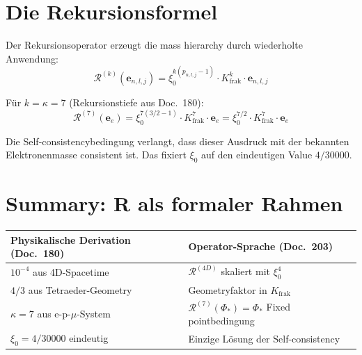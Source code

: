\section{Die Rekursionsformel}

Der Rekursionsoperator erzeugt die mass hierarchy durch wiederholte
Anwendung:
\begin{equation}
  \mathcal{R}^{(k)}(\mathbf{e}_{n,l,j})
  = \xi_0^{k(p_{n,l,j}-1)} \cdot K_{\text{frak}}^k
  \cdot \mathbf{e}_{n,l,j}
  \label{eq:rekursion-k}
\end{equation}

Für $k = \kappa = 7$ (Rekursionstiefe aus Doc.~180):
\begin{equation}
  \mathcal{R}^{(7)}(\mathbf{e}_e) = \xi_0^{7(3/2-1)} \cdot K_{\text{frak}}^7
  \cdot \mathbf{e}_e
  = \xi_0^{7/2} \cdot K_{\text{frak}}^7 \cdot \mathbf{e}_e
\end{equation}

Die Self-consistencybedingung verlangt, dass dieser Ausdruck mit der
bekannten Elektronenmasse consistent ist. Das fixiert $\xi_0$
auf den eindeutigen Value $4/30000$.

\section{Summary: R als formaler Rahmen}

\begin{center}
{\footnotesize
\begin{tabular}{p{4.5cm}p{6cm}}
\toprule
\textbf{Physikalische Derivation} (Doc.~180) &
\textbf{Operator-Sprache} (Doc.~203) \\
\midrule
$10^{-4}$ aus 4D-Spacetime &
  $\mathcal{R}^{(4D)}$ skaliert mit $\xi_0^4$ \\[4pt]
$4/3$ aus Tetraeder-Geometry &
  Geometryfaktor in $K_{\text{frak}}$ \\[4pt]
$\kappa = 7$ aus e-p-$\mu$-System &
  $\mathcal{R}^{(7)}(\Phi_*) = \Phi_*$ Fixed pointbedingung \\[4pt]
$\xi_0 = 4/30000$ eindeutig &
  Einzige Lösung der Self-consistency \\
\bottomrule
\end{tabular}
}
\end{center}

